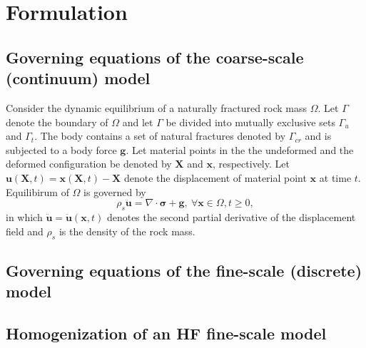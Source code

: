 \section{Formulation}

\subsection{Governing equations of the coarse-scale (continuum) model}
Consider the dynamic equilibrium of a naturally fractured rock mass $\Omega$. Let $\Gamma$ denote the boundary of $\Omega$ and let $\Gamma$ be divided into mutually exclusive sets $\Gamma_u$ and $\Gamma_t$.   The body contains a set of natural fractures denoted by $\Gamma_{cr}$ and is subjected to a body force $\mathbf{g}$.  Let material points in the the undeformed and the deformed configuration be denoted by $\mathbf{X}$ and $\mathbf{x}$, respectively. Let $\mathbf{u}\left(\mathbf{X}, t\right)=\mathbf{x}\left(\mathbf{X}, t\right)-\mathbf{X}$ denote the displacement of material point $\mathbf{x}$ at time $t$.    Equilibirum of $\Omega$ is governed by
\begin{equation}
\label{eqn:equil}
\rho_s \ddot{\mathbf{u}} =\nabla \cdot \boldsymbol{\sigma} +\mathbf{g},\:\forall \mathbf{x}\in\Omega, t\geq0,
\end{equation}
in which $\ddot{\mathbf{u}}=\ddot{\mathbf{u}}\left(\mathbf{x}, t\right)$ denotes the second partial derivative of the displacement field and $\rho_s$ is the density of the rock mass. 


\subsection{Governing equations of the fine-scale (discrete) model}
\subsection{Homogenization of an HF fine-scale model}




